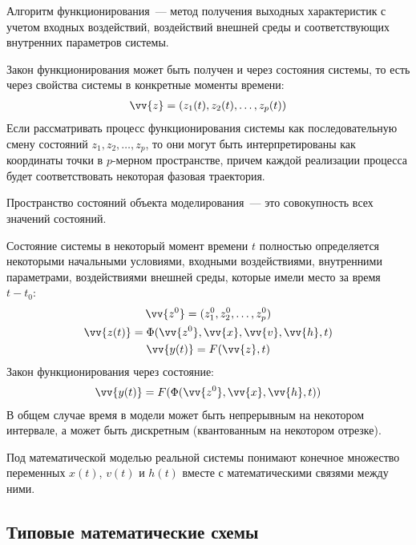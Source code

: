 \begin{dd}
    Алгоритм функционирования~--- метод получения выходных характеристик с учетом входных воздействий, воздействий внешней среды и соответствующих внутренних параметров системы.
\end{dd}

Закон функционирования может быть получен и через состояния системы, то есть через свойства системы в конкретные моменты времени:
%
\begin{gather*}
    \vv{z} = (z_1(t), z_2(t), \dots, z_p(t))
\end{gather*}
%
Если рассматривать процесс функционирования системы как последовательную смену состояний $z_1, z_2, \dots, z_p$, то они могут быть интерпретированы как координаты точки в $p$-мерном пространстве, причем каждой реализации процесса будет соответствовать некоторая фазовая траектория.

\begin{dd}
    Пространство состояний объекта моделирования~--- это совокупность всех значений состояний.
\end{dd}

Состояние системы в некоторый момент времени $t$ полностью определяется некоторыми начальными условиями, входными воздействиями, внутренними параметрами, воздействиями внешней среды, которые имели место за время $t - t_0$:
%
\begin{gather*}
    \vv{z^0} = (z_1^0, z_2^0, \dots, z_p^0)\\
    \vv{z(t)} = \Phi(\vv{z^0}, \vv{x}, \vv{v}, \vv{h}, t)\\
    \vv{y(t)} = F(\vv{z}, t)
\end{gather*}
%
Закон функционирования через состояние:
%
\begin{gather*}
    \vv{y(t)} = F(\Phi(\vv{z^0}, \vv{x}, \vv{h}, t))
\end{gather*}
%
В общем случае время в модели может быть непрерывным на некотором интервале, а может быть дискретным (квантованным на некотором отрезке).

\begin{dd}
    Под математической моделью реальной системы понимают конечное множество переменных $x(t)$, $v(t)$ и $h(t)$ вместе с математическими связями между ними.
\end{dd}

\subsection{Типовые математические схемы}

